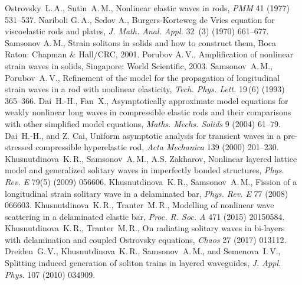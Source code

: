 \documentclass[12pt, a4paper]{article}
\begin{document}
\begin{thebibliography}{99}

	 Ostrovsky~L.\,A., Sutin~A.\,M., Nonlinear elastic waves in rods, \textit{PMM} 41 (1977) 531--537.
	 Nariboli G.\,A., Sedov A., Burgers-Korteweg de Vries equation for viscoelastic rods and plates, \textit{J. Math. Anal. Appl.} 32~(3) (1970) 661--677.
	 Samsonov A.\,M., Strain solitons in solids and how to construct them, Boca Raton: Chapman \& Hall/CRC, 2001.
	 Porubov A.\,V., Amplification of nonlinear strain waves in solids, Singapore: World Scientific, 2003.	
	 Samsonov~A.\,M., Porubov~A.\,V., Refinement of the model for the propagation of longitudinal strain waves in a rod with nonlinear elasticity, \textit{Tech. Phys. Lett.} 19\,(6) (1993) 365--366.
	 Dai~H.-H., Fan~X., Asymptotically approximate model equations for weakly nonlinear long waves in compressible elastic rods and their comparisons with other simplified model equations, \textit{Maths. Mechs. Solids} 9 (2004) 61--79.
	 Dai~H.-H., and Z. Cai, Uniform asymptotic analysis for transient waves in a pre-stressed compressible hyperelastic rod, \textit{Acta Mechanica} 139 (2000) 201--230.
	 Khusnutdinova~K.\,R., Samsonov~A.\,M., A.S. Zakharov, Nonlinear layered lattice model and generalized solitary waves in imperfectly bonded structures, \textit{Phys. Rev. E} 79(5) (2009) 056606.
	 Khusnutdinova~K.\,R., Samsonov~A.\,M., Fission of a longitudinal strain solitary wave in a delaminated bar, \textit{Phys. Rev. E} 77 (2008) 066603.
	 Khusnutdinova~K.\,R., Tranter~M.\,R., Modelling of nonlinear wave scattering in a delaminated elastic bar, \textit{Proc. R. Soc. A} 471 (2015) 20150584.
	 Khusnutdinova~K.\,R., Tranter~M.\,R., On radiating solitary waves in bi-layers with delamination and coupled Ostrovsky equations, \textit{Chaos} 27 (2017) 013112.
	 Dreiden~G.\,V., Khusnutdinova~K.\,R., Samsonov~A.\,M., and Semenova~I.\,V., Splitting induced generation of soliton trains in layered waveguides, \textit{J. Appl. Phys.} 107 (2010) 034909.

\end{thebibliography}
\end{document}
